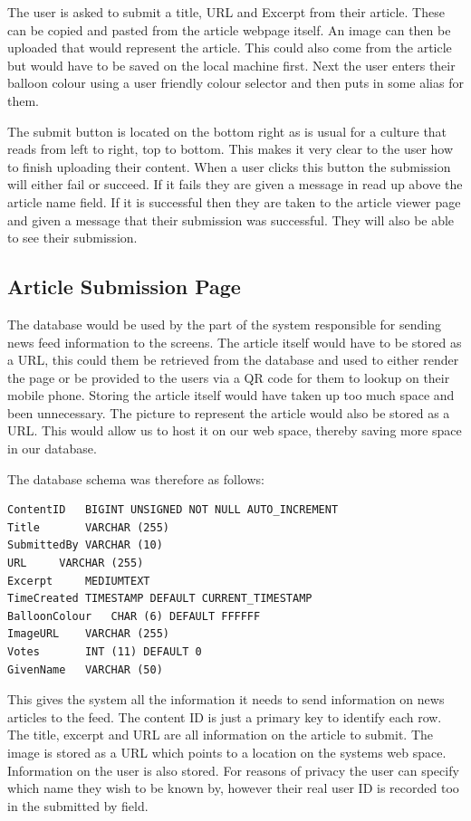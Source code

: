 The user is asked to submit a title, URL and Excerpt from their article. These can be copied and pasted from the article webpage itself. An image can then be uploaded that would represent the article. This could also come from the article but would have to be saved on the local machine first. Next the user enters their balloon colour using a user friendly colour selector and then puts in some alias for them. 

The submit button is located on the bottom right as is usual for a culture that reads from left to right, top to bottom. This makes it very clear to the user how to finish uploading their content. When a user clicks this button the submission will either fail or succeed. If it fails they are given a message in read up above the article name field. If it is successful then they are taken to the article viewer page and given a message that their submission was successful. They will also be able to see their submission.

\subsection{Article Submission Page}
The database would be used by the part of the system responsible for sending news feed information to the screens. The article itself would have to be stored as a URL, this could them be retrieved from the database and used to either render the page or be provided to the users via a QR code for them to lookup on their mobile phone. Storing the article itself would have taken up too much space and been unnecessary. The picture to represent the article would also be stored as a URL. This would allow us to host it on our web space, 
thereby saving more space in our database. 

The database schema was therefore as follows: 

\singlespacing
\begin{verbatim}ContentID	BIGINT UNSIGNED NOT NULL AUTO_INCREMENT
Title		VARCHAR (255)
SubmittedBy	VARCHAR (10)
URL		VARCHAR (255)
Excerpt		MEDIUMTEXT
TimeCreated	TIMESTAMP DEFAULT CURRENT_TIMESTAMP
BalloonColour	CHAR (6) DEFAULT FFFFFF
ImageURL	VARCHAR (255)
Votes		INT (11) DEFAULT 0
GivenName	VARCHAR (50)\end{verbatim}
\onehalfspacing

This gives the system all the information it needs to send information on news articles to the feed. The content ID is just a primary key to identify each row. The title, excerpt and URL are all information on the article to submit. The image is stored as a URL which points to a location on the systems web space. Information on the user is also stored. For reasons of privacy the user can specify which name they wish to be known by, however their real user ID is recorded too in the submitted by field.

